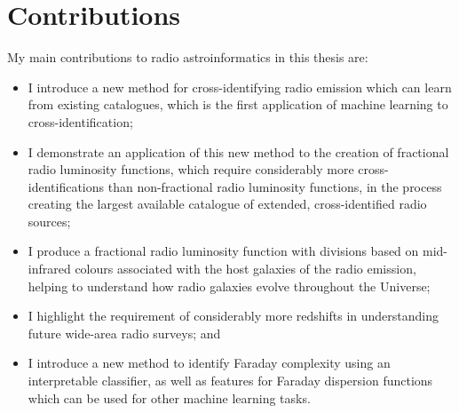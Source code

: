 \section{Contributions}
\label{sec:contributions}

My main contributions to radio astroinformatics in this thesis are:
\begin{itemize}
    \item I introduce a new method for cross-identifying radio emission which can learn from existing catalogues, which is the first application of machine learning to cross-identification;
    \item I demonstrate an application of this new method to the creation of fractional radio luminosity functions, which require considerably more cross-identifications than non-fractional radio luminosity functions, in the process creating the largest available catalogue of extended, cross-identified radio sources;
    \item I produce a fractional radio luminosity function with divisions based on mid-infrared colours associated with the host galaxies of the radio emission, helping to understand how radio galaxies evolve throughout the Universe;
    \item I highlight the requirement of considerably more redshifts in understanding future wide-area radio surveys; and
    \item I introduce a new method to identify Faraday complexity using an interpretable classifier, as well as features for Faraday dispersion functions which can be used for other machine learning tasks.
\end{itemize}
